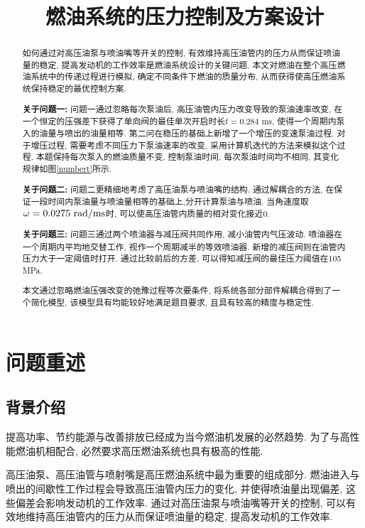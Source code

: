 \documentclass{cumcmthesis}
\title{燃油系统的压力控制及方案设计}
\begin{document}
 \maketitle
 \begin{abstract} 
如何通过对高压油泵与喷油嘴等开关的控制, 有效维持高压油管内的压力从而保证喷油量的稳定, 提高发动机的工作效率是燃油系统设计的关键问题. 本文对燃油在整个高压燃油系统中的传递过程进行模拟, 确定不同条件下燃油的质量分布, 从而获得使高压燃油系统保持稳定的最优控制方案. 

\textbf{关于问题一: } 问题一通过忽略每次泵油后, 高压油管内压力改变导致的泵油速率改变, 在一个恒定的压强差下获得了单向阀的最佳单次开启时长$t = 0.284\text{ ms}$, 使得一个周期内泵入的油量与喷出的油量相等. 
第二问在稳压的基础上新增了一个增压的变速泵油过程. 对于增压过程, 需要考虑不同压力下泵油速率的改变, 采用计算机迭代的方法来模拟这个过程. 本题保持每次泵入的燃油质量不变, 控制泵油时间, 每次泵油时间均不相同, 其变化规律如图\ref{numbert}所示. 

\textbf{关于问题二: } 问题二更精细地考虑了高压油泵与喷油嘴的结构. 通过解耦合的方法, 在保证一段时间内泵油量与喷油量相等的基础上,分开计算泵油与喷油. 当角速度取$\omega=0.0275\ \rm{rad/ms}$时, 可以使高压油管内质量的相对变化接近0.

\textbf{关于问题三: } 问题三通过两个喷油器与减压阀共同作用, 减小油管内气压波动. 喷油器在一个周期内平均地交替工作, 视作一个周期减半的等效喷油器. 新增的减压阀则在油管内压力大于一定阈值时打开. 通过比较前后的方差, 可以得知减压阀的最佳压力阈值在105 MPa.

本文通过忽略燃油压强改变的弛豫过程等次要条件, 将系统各部分部件解耦合得到了一个简化模型, 该模型具有均能较好地满足题目要求, 且具有较高的精度与稳定性. 

\end{abstract}

\tableofcontents

\newpage

\section{问题重述}
\subsection{背景介绍}
提高功率、节约能源与改善排放已经成为当今燃油机发展的必然趋势. 为了与高性能燃油机相配合, 必然要求高压燃油系统也具有极高的性能. 

高压油泵、高压油管与喷射嘴是高压燃油系统中最为重要的组成部分. 燃油进入与喷出的间歇性工作过程会导致高压油管内压力的变化, 并使得喷油量出现偏差, 这些偏差会影响发动机的工作效率. 通过对高压油泵与喷油嘴等开关的控制, 可以有效地维持高压油管内的压力从而保证喷油量的稳定, 提高发动机的工作效率. 
\end{document}
